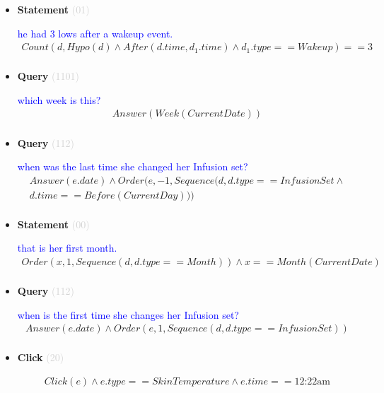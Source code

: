 \documentclass[11pt]{article}
\newcommand{\key}[1]{\textcolor{lightgray}{#1}}
\newcounter{CQuery}
\newcounter{CStatement}
\newcounter{CClick}
\begin{document}
\begin{itemize}
\item
\textbf{Statement\theCStatement} \key{(01)} \addtocounter{CStatement}{1}
\textcolor{blue}{ he had 3 lows after a wakeup event. }
\begin{multline*}
Count(d, Hypo(d) \wedge After(d.time, d_1.time) \wedge d_1.type==Wakeup)==3 \\ 
\end{multline*}


\item
\textbf{Query\theCQuery} \key{(1101)} \addtocounter{CQuery}{1}
\textcolor{blue}{ which week is this? }
\begin{multline*}
Answer(Week(CurrentDate)) \\ 
\end{multline*}


\item
\textbf{Query\theCQuery} \key{(112)} \addtocounter{CQuery}{1}
\textcolor{blue}{ when was the last time she changed her Infusion set? }
\begin{multline*}
Answer(e.date) \wedge Order(e, -1, Sequence(d, d.type==InfusionSet\wedge \\ 
d.time==Before(CurrentDay))) \\ 
\end{multline*}


\item
\textbf{Statement\theCStatement} \key{(00)} \addtocounter{CStatement}{1}
\textcolor{blue}{ that is her first month. }
\begin{multline*}
Order(x, 1, Sequence(d, d.type==Month)) \wedge x==Month(CurrentDate) \\ 
\end{multline*}


\item
\textbf{Query\theCQuery} \key{(112)} \addtocounter{CQuery}{1}
\textcolor{blue}{ when is the first time she changes her Infusion set? }
\begin{multline*}
Answer(e.date) \wedge Order(e, 1, Sequence(d, d.type==InfusionSet)) \\ 
\end{multline*}


\item
\textbf{Click\theCClick} \key{(20)} \addtocounter{CClick}{1}
\textcolor{blue}{  }
\begin{multline*}
Click(e) \wedge e.type==SkinTemperature \wedge e.time==\mbox{12:22am} \\ 
\end{multline*}



\end{itemize}
\end{document}
